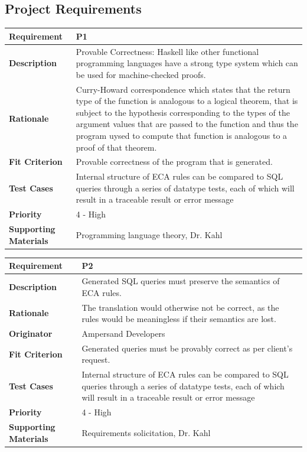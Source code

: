 \documentclass[12pt]{report}
\begin{document}
\subsection{Project Requirements}
{\setlength{\tabcolsep}{6pt} %
    \begin{tabularx}{\textwidth}{>{\bfseries}C{3cm}X}
        Requirement & P1 \\ 
        \midrule
        \endhead
        Description  & Provable Correctness: Haskell like other functional 
        programming languages have 
        a strong type system which can be used for machine-checked proofs.
        \\	Rationale & Curry-Howard correspondence which states that the 
        return type of the function is analogous to a logical theorem, that is 
        subject to the hypothesis corresponding to the types of the argument 
        values that are passed to the function and thus the program uysed to 
        compute that function is analogous to a proof of that theorem.
        \\	Fit Criterion & Provable correctness of the program that is 
        generated.
        \\ Test Cases & Internal structure of ECA rules can be compared to SQL 
        queries through a series of datatype tests, each of which will result 
        in a traceable result or error message
        \\	Priority & 4 - High
        \\	Supporting Materials & Programming language theory, Dr. Kahl
        \vspace{12pt}
    \end{tabularx}
}
{\setlength{\tabcolsep}{6pt} %
    \begin{tabularx}{\textwidth}{>{\bfseries}C{3cm}X}
        Requirement & P2 \\ 
        \midrule
        \endhead
        Description  & Generated SQL queries must preserve the semantics of ECA 
        rules.  
        \\	Rationale & The translation would otherwise not be correct, as the 
        rules would be meaningless if their semantics are lost.
        \\	Originator & Ampersand Developers
        \\	Fit Criterion & Generated queries must be provably correct as per 
        client's request.
        \\ Test Cases & Internal structure of ECA rules can be compared to SQL 
        queries through a series of datatype tests, each of which will result 
        in a traceable result or error message
        \\	Priority & 4 - High
        \\	Supporting Materials & Requirements solicitation, Dr. Kahl
        \vspace{12pt}
    \end{tabularx}
}
\end{document}
